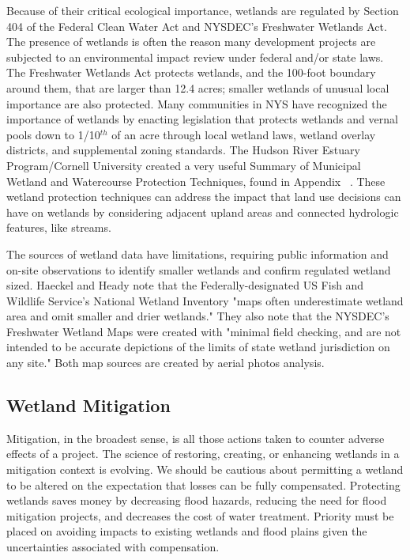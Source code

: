 Because of their critical ecological importance, wetlands are regulated by 
Section 404 of the Federal Clean Water Act and NYSDEC's Freshwater Wetlands 
Act. The presence of wetlands is often the reason many development projects are 
subjected to an environmental impact review under federal and/or state laws. The 
Freshwater Wetlands Act protects wetlands, and the 100-foot boundary around 
them, that are larger than 12.4 acres; smaller wetlands of unusual local 
importance are also protected. Many communities in NYS have recognized the 
importance of wetlands by enacting legislation that protects wetlands and vernal 
pools down to 1/10$^{th}$ of an acre through local wetland laws, wetland overlay 
districts, and supplemental zoning standards. The Hudson River Estuary 
Program/Cornell University created a very useful Summary of Municipal Wetland 
and Watercourse Protection Techniques, found in Appendix 
~. These wetland protection techniques can address the 
impact that land use decisions can have on wetlands by considering adjacent 
upland areas and connected hydrologic features, like streams.

The sources of wetland data have limitations, requiring public information and 
on-site observations to identify smaller wetlands and confirm regulated wetland 
sized. Haeckel and Heady note that the Federally-designated US Fish and 
Wildlife Service’s National Wetland Inventory "maps often underestimate wetland 
area and omit smaller and drier wetlands." They also note that the NYSDEC's 
Freshwater Wetland Maps were created with "minimal field checking, and are not 
intended to be accurate depictions of the limits of state wetland jurisdiction 
on any site." Both map sources are created by aerial photos analysis.

\subsection*{Wetland Mitigation}
Mitigation, in the broadest sense, is all those actions taken to counter adverse 
effects of a project. The science of restoring, creating, or enhancing wetlands 
in a mitigation context is evolving. We should be cautious about permitting a 
wetland to be altered on the expectation that losses can be fully compensated. 
Protecting wetlands saves money by decreasing flood hazards, reducing the need 
for flood mitigation projects, and decreases the cost of water treatment. 
Priority must be placed on avoiding impacts to existing wetlands and flood 
plains given the uncertainties associated with compensation.

